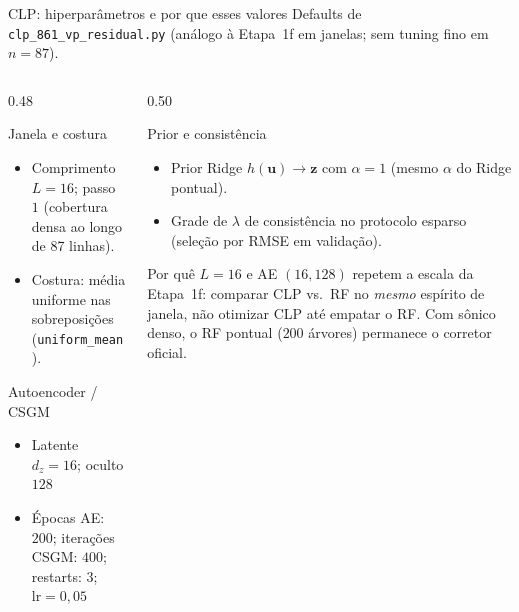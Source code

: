 \documentclass[aspectratio=169,10pt]{beamer}
\begin{document}
\begin{frame}[shrink=5]{CLP: hiperparâmetros e por que esses valores}
  \scriptsize
  Defaults de \texttt{clp\_861\_vp\_residual.py} (análogo à Etapa~1f em
  janelas; sem tuning fino em $n=87$).
  \vspace{0.06cm}
  \begin{columns}[T,onlytextwidth]
    \begin{column}{0.48\textwidth}
      \begin{block}{Janela e costura}
        \scriptsize
        \begin{itemize}\setlength{\itemsep}{0.08em}
          \item Comprimento $L=16$; passo $1$
                (cobertura densa ao longo de 87 linhas).
          \item Costura: média uniforme nas sobreposições
                (\texttt{uniform\_mean}).
        \end{itemize}
      \end{block}
      \vspace{0.06cm}
      \begin{block}{Autoencoder / CSGM}
        \scriptsize
        \begin{itemize}\setlength{\itemsep}{0.08em}
          \item Latente $d_z=16$; oculto $128$
          \item Épocas AE: $200$;
                iterações CSGM: $400$;
                restarts: $3$;
                $\mathrm{lr}=0{,}05$
        \end{itemize}
      \end{block}
    \end{column}
    \begin{column}{0.50\textwidth}
      \begin{block}{Prior e consistência}
        \scriptsize
        \begin{itemize}\setlength{\itemsep}{0.08em}
          \item Prior Ridge $h(\mathbf{u})\to\mathbf{z}$ com
                $\alpha=1$ (mesmo $\alpha$ do Ridge pontual).
          \item Grade de $\lambda$ de consistência no protocolo
                esparso (seleção por RMSE em validação).
        \end{itemize}
      \end{block}
      \vspace{0.06cm}
      \begin{exampleblock}{Por quê}
        \scriptsize
        $L=16$ e AE $(16,128)$ repetem a escala da Etapa~1f:
        comparar CLP vs.\ RF no \emph{mesmo} espírito de janela,
        não otimizar CLP até empatar o RF.
        Com sônico denso, o RF pontual ($200$ árvores) permanece o
        corretor oficial.
      \end{exampleblock}
    \end{column}
  \end{columns}
\end{frame}
\end{document}
